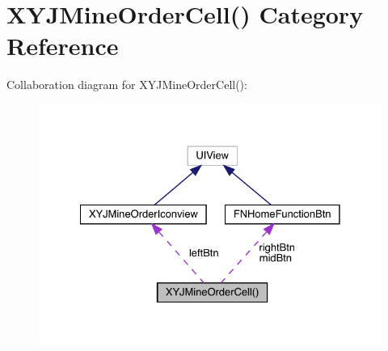 \hypertarget{category_x_y_j_mine_order_cell_07_08}{}\section{X\+Y\+J\+Mine\+Order\+Cell() Category Reference}
\label{category_x_y_j_mine_order_cell_07_08}


Collaboration diagram for X\+Y\+J\+Mine\+Order\+Cell()\+:\nopagebreak
\begin{figure}[H]
\begin{center}
\leavevmode
\includegraphics[width=328pt]{category_x_y_j_mine_order_cell_07_08__coll__graph}
\end{center}
\end{figure}
